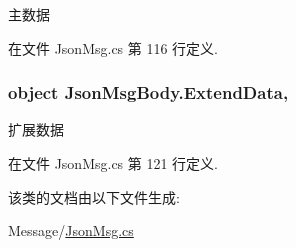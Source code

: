 主数据 



在文件 Json\-Msg.\-cs 第 116 行定义.

\hypertarget{class_json_msg_body_a065ec25afa57ebd3ff8424d0a8b6a056}{
\subsubsection[{Extend\-Data}]{\setlength{\rightskip}{0pt plus 5cm}object Json\-Msg\-Body.\-Extend\-Data\hspace{0.3cm}{\ttfamily [get]}, {\ttfamily [set]}}}\label{class_json_msg_body_a065ec25afa57ebd3ff8424d0a8b6a056}


扩展数据 



在文件 Json\-Msg.\-cs 第 121 行定义.



该类的文档由以下文件生成\-:\begin{DoxyCompactItemize}
\item 
Message/\hyperlink{_json_msg_8cs}{Json\-Msg.\-cs}\end{DoxyCompactItemize}
